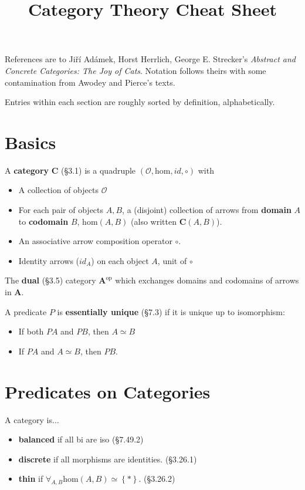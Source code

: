 \documentclass[10pt,twocolumn,letterpaper]{article}
\title{Category Theory Cheat Sheet}
\newcommand{\set}[1]{\left\{{#1}\right\}}
\newcommand{\defn}[1]{{\bf #1}}
\begin{document}
References are to Ji\v{r}\'i Ad\'amek, Horst Herrlich, George
E. Strecker's {\em Abstract and Concrete Categories: The Joy of Cats}.
Notation follows theirs with some contamination from Awodey and Pierce's
texts.

Entries within each section are roughly sorted by definition, alphabetically.

\section{Basics}

  A \defn{category} $\mathbf{C}$ (\S3.1) is a quadruple
  $(\mathcal{O},\mbox{hom},id,\circ)$ with
  \begin{itemize}
    \item A collection of objects $\mathcal{O}$
  \item For each pair of objects $A,B$, a (disjoint) collection of arrows
    from \defn{domain} $A$ to \defn{codomain} $B$,
    $\mbox{hom}(A,B)$ (also written $\mathbf{C}(A,B)$).
    \item An associative arrow composition operator $\circ$.
    \item Identity arrows ($id_A$) on each object $A$, unit of $\circ$
  \end{itemize}

  The \defn{dual} (\S3.5) category $\mathbf{A}^\text{op}$ which
    exchanges domains and codomains of arrows in $\mathbf{A}$.

  A predicate $P$ is \defn{essentially unique} (\S7.3) if it is unique up to
  isomorphism:
  \begin{itemize}
    \item If both $PA$ and $PB$, then $A \simeq B$
    \item If $PA$ and $A \simeq B$, then $PB$.
  \end{itemize}

\section{Predicates on Categories}

  A category is$\dots$
  \begin{itemize}
    \item \defn{balanced} if all bi are iso (\S7.49.2)
    \item \defn{discrete} if all morphisms are identities. (\S3.26.1)
    \item \defn{thin} if $\forall_{A,B} \mbox{hom}(A,B) \simeq \set{*}$. (\S3.26.2)
  \end{itemize}
\end{document}
